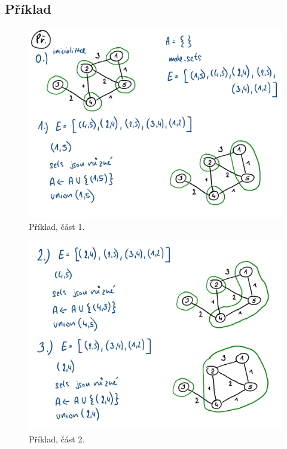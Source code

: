 \subsection*{Příklad}

\begin{figure}[H]
    \centering
    \includegraphics[width=0.9\linewidth]{03-minimalni-kostry-11.pdf}
    \caption{Příklad, část 1.}
\end{figure}

\begin{figure}[H]
    \centering
    \includegraphics[width=0.9\linewidth]{03-minimalni-kostry-12.pdf}
    \caption{Příklad, část 2.}
\end{figure}

